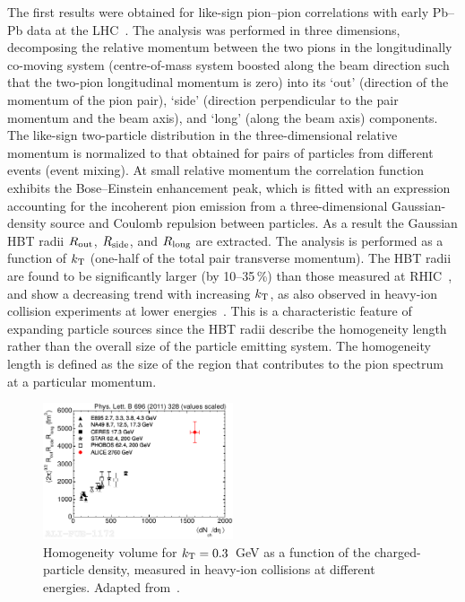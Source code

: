 The first results were obtained for like-sign pion--pion correlations with early Pb--Pb data at the LHC~\cite{Aamodt:2011mr}. The analysis was performed in three dimensions, decomposing the relative momentum between the two pions in the longitudinally co-moving system (centre-of-mass system boosted along the beam direction such that the two-pion longitudinal momentum is zero) into its `out' (direction of the momentum of the pion pair), `side' (direction perpendicular to the pair momentum and the beam axis), and `long' (along the beam axis) components. The like-sign two-particle distribution in the three-dimensional relative momentum is normalized to that obtained for pairs of particles from different events (event mixing). At small relative momentum the correlation function exhibits the Bose--Einstein enhancement peak, which is fitted with an expression accounting for the incoherent pion emission from a three-dimensional Gaussian-density source and Coulomb repulsion between particles. As a result the Gaussian HBT radii $R_{\rm out}$, $R_{\rm side}$, and $R_{\rm long}$ are extracted. The analysis is performed as a function of $k_{\rm T}$ (one-half of the total pair transverse momentum). The HBT radii are found to be significantly larger (by 10--35\,\%) than those measured at RHIC~\cite{Adams:2004yc}, and show a decreasing trend with increasing $k_{\rm T}$, as also observed in heavy-ion collision experiments at lower energies~\cite{Lisa:2005dd}. This is a characteristic feature of expanding particle sources since the HBT radii describe the homogeneity length rather than the overall size of the particle emitting system. The homogeneity length is defined as the size of the region that contributes to the pion spectrum at a particular momentum.

\begin{figure}
\centering
\includegraphics[width=0.5\textwidth]{ksfigures/HBTVolumeVsDensity.pdf}
\caption{Homogeneity volume for $k_{\rm T} = 0.3$~GeV as a function of the charged-particle density, measured in heavy-ion collisions at different energies. Adapted from~\cite{Aamodt:2011mr}.}
\label{figks:HBTvolume}
\end{figure}

